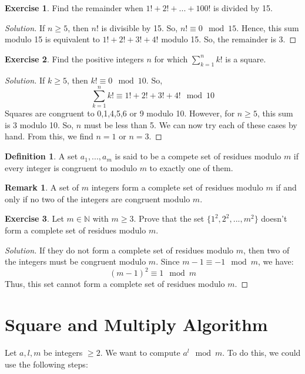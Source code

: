 \documentclass[12pt,letterpaper]{amsbook}
\theoremstyle{definition}
\newtheorem{definition}{Definition} %
\newtheorem*{remark}{Remark}
\newtheorem*{exercise}{Exercise}
\newenvironment{solution}
  {\renewcommand\qedsymbol{$\blacksquare$}\begin{proof}[Solution]}
  {\end{proof}}
\newcommand{\N}{\mathbb{N}}
\begin{document}
\begin{exercise}
  Find the remainder when $1!+2!+...+100!$ is divided by 15. 
\end{exercise}
\begin{solution}
  If $n \geq 5$, then $n!$ is divisible by 15. So, $n! \equiv 0 \mod 15$. Hence, this sum modulo 15 is equivalent to $1!+2!+3!+4!$ modulo 15. So, the remainder is 3. 
\end{solution}
\begin{exercise}
  Find the positive integers $n$ for which $\sum_{k=1}^n k!$ is a square.  
\end{exercise}
\begin{solution}
  If $k \geq 5$, then $k! \equiv 0 \mod 10$. So,
  \[\sum_{k=1}^n k! \equiv 1!+2!+3!+4! \mod 10\]
  Squares are congruent to 0,1,4,5,6 or 9 modulo 10. However, for $n \geq 5$, this sum is 3 modulo 10. So, $n$ must be less than 5. We can now try each of these cases by hand. From this, we find $n=1$ or $n=3$.
\end{solution}

\begin{definition}
  A set $a_1,...,a_m$ is said to be a compete set of residues modulo $m$ if every integer is congruent to modulo $m$ to exactly one of them. 
\end{definition}

\begin{remark}
  A set of $m$ integers form a complete set of residues modulo $m$ if and only if no two of the integers are congruent modulo $m$. 
\end{remark}

\begin{exercise}
  Let $m \in \N$ with $m \geq 3$. Prove that the set $\{1^2,2^2,...,m^2\}$ doesn't form a complete set of residues modulo $m$.
\end{exercise}
\begin{solution}
  If they do not form a complete set of residues modulo $m$, then two of the integers must be congruent modulo $m$. Since $m-1 \equiv -1 \mod m$, we have:
  \[(m-1)^2 \equiv 1 \mod m\]
  Thus, this set cannot form a complete set of residues modulo $m$.
\end{solution}

\section{Square and Multiply Algorithm}

Let $a,l,m$ be integers $\geq 2$. We want to compute $a^l \mod m$. To do this, we could use the following steps:
\end{document}
